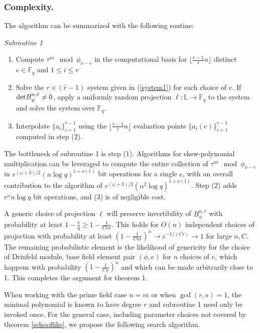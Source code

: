\documentclass[sigconf]{acmart}
\newcommand{\F}{\mathbb{F}}
\renewcommand{\L}{\mathbb{L}}
\newcommand{\hatr}{\hat{r}}
\begin{document}
\subsubsection{Complexity.}

The algorithm can be summarized with the following routine:

\textit{Subroutine 1}
\begin{enumerate}
    \item Compute $\tau^{ni} \mod \phi_{x-e}$ in the computational basis for $\lfloor\frac{r-1}{r}n \rfloor$ distinct $e \in \F_q$ and $1 \leq i \leq r$
    \item Solve the $r \times (\hatr-1)$ system given in (\ref{system1}) for each choice of $e$. If $\textnormal{det} B_{\psi}^{n,\hatr} \neq 0$, apply a uniformly random projection $\ell : \L \to \F_q$ to the system and solve the system over $\F_q$.
    \item Interpolate $\{a_i\}_{i=1}^{\hatr-1}$ using the $\lfloor\frac{r-1}{r}n \rfloor$ evaluation points $\{a_i(e)\}_{i=1}^{r-1}$ computed in step (2). 
\end{enumerate}

The bottleneck of subroutine 1 is step (1). Algorithms for skew-polynomial multiplication can be leveraged to compute the entire collection of $\tau^{ni} \mod \phi_{x - e}$ in $r^{(\omega+3)/2}(n \log q)^{1 + o(1)}$ bit operations for a single $e$, with an overall contribution to the algorithm of $r^{(\omega+3)/2}(n^2 \log q)^{1 + o(1)}$. Step (2) adds $r^{\omega}n\log q$ bit operations, and (3) is of negligible cost. 

A generic choice of projection $\ell$ will preserve invertibility of $B_{\phi}^{n, \hatr}$ with probability at least $1 - \frac{\hatr}{q} \geq 1 - \frac{1}{Cnr} $. This holds for $O(n)$ independent choices of projection with probability at least $(1 - \frac{1}{Cnr})^n \to e^{-1/(Cr)} \to 1$ for large $n, C$. The remaining probabilistic element is the likelihood of genericity for the choice of Drinfeld module, base field element pair $(\phi, e)$ for $n$ choices of $e$, which happens with probability $(1 - \frac{1}{Cn})^{n}$ and which can be made arbitrarily close to 1. This completes the argument for theorem 1.

When working with the prime field case $n = m$ or when $\gcd(r, s) = 1$, the minimal polynomial is known to have degree $r$ and subroutine 1 need only be invoked once. For the general case, including parameter choices not covered by theorem \ref{schooflike}, we propose the following search algorithm.
\end{document}
